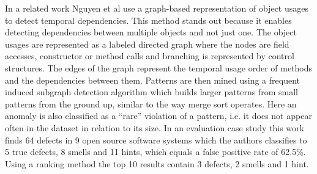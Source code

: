 In a related work Nguyen et al \cite{nguyen2009graph} use a graph-based representation of object usages to detect temporal dependencies.
This method stands out because it enables detecting dependencies between multiple objects and not just one.
The object usages are represented as a labeled directed graph where the nodes are field accesses, constructor or method calls and branching is represented by control structures.
The edges of the graph represent the temporal usage order of methods and the dependencies between them.
Patterns are then mined using a frequent induced subgraph detection algorithm which builds larger patterns from small patterns from the ground up, similar to the way merge sort operates.
Here an anomaly is also classified as a ``rare'' violation of a pattern, i.e. it does not appear often in the dataset in relation to its size.
In an evaluation case study this work finds 64 defects in 9 open source software systems which the authors classifies to 5 true defects, 8 smells and 11 hints, which equals a false positive rate of 62.5\%.
Using a ranking method the top 10 results contain 3 defects, 2 smells and 1 hint.



